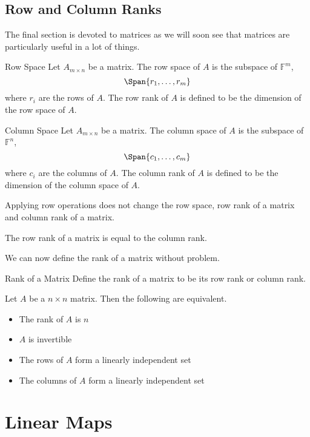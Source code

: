 \subsection{Row and Column Ranks}
The final section is devoted to matrices as we will soon see that matrices are particularly useful in a lot of things. 
\begin{defn}{Row Space}{} Let $A_{m\times n}$ be a matrix. The row space of $A$ is the subspace of $\mathbb{F}^m$, $$\Span\{r_1,\dots,r_m\}$$ where $r_i$ are the rows of $A$. The row rank of $A$ is defined to be the dimension of the row space of $A$. 
\end{defn}

\begin{defn}{Column Space}{} Let $A_{m\times n}$ be a matrix. The column space of $A$ is the subspace of $\mathbb{F}^n$, $$\Span\{c_1,\dots,c_m\}$$ where $c_i$ are the columns of $A$. The column rank of $A$ is defined to be the dimension of the column space of $A$. 
\end{defn}

\begin{lmm}{}{} Applying row operations does not change the row space, row rank of a matrix and column rank of a matrix. 
\end{lmm}

\begin{thm}{}{} The row rank of a matrix is equal to the column rank. 
\end{thm}

We can now define the rank of a matrix without problem. 

\begin{defn}{Rank of a Matrix}{} Define the rank of a matrix to be its row rank or column rank. 
\end{defn}

\begin{prp}{}{} Let $A$ be a $n\times n$ matrix. Then the following are equivalent. 
\begin{itemize}
\item The rank of $A$ is $n$
\item $A$ is invertible
\item The rows of $A$ form a linearly independent set
\item The columns of $A$ form a linearly independent set
\end{itemize}
\end{prp}

\pagebreak
\section{Linear Maps}
